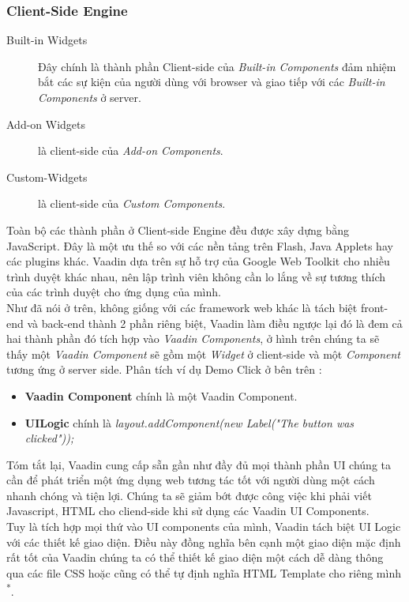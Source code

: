 \subsubsection{Client-Side Engine}
\begin{description}
\item[Built-in Widgets] Đây chính là thành phần Client-side của \textit{Built-in Components} đảm nhiệm bắt các sự kiện của người dùng với browser và giao tiếp với các \textit{Built-in Components} ở server.
\item[Add-on Widgets] là client-side của \textit{Add-on Components}.
\item[Custom-Widgets] là client-side của \textit{Custom Components}.
\end{description}
Toàn bộ các thành phần ở Client-side Engine đều được xây dựng bằng JavaScript. Đây là một ưu thế so với các nền tảng trên Flash, Java Applets hay các plugins khác. Vaadin dựa trên sự hỗ trợ của Google Web Toolkit cho nhiều trình duyệt khác nhau, nên lập trình viên không cần lo lắng về sự tương thích của các trình duyệt cho ứng dụng của mình.
\\
Như đã nói ở trên, không giống với các framework web khác là tách biệt front-end và back-end thành 2 phần riêng biệt, Vaadin làm điều ngược lại đó là đem cả hai thành phần đó tích hợp vào \textit{Vaadin Components}, ở hình trên chúng ta sẽ thấy một \textit{Vaadin Component} sẽ gồm một \textit{Widget} ở client-side  và một \textit{Component} tương ứng ở server side. Phân tích ví dụ Demo Click ở bên trên :
\begin{itemize}
\item \textbf{Vaadin Component} chính là một Vaadin Component.
\item \textbf{UILogic} chính là \textit{layout.addComponent(new Label("The button was clicked"));}
\end{itemize}

Tóm tắt lại, Vaadin cung cấp sẵn gần như đầy đủ mọi thành phần UI chúng ta cần để phát triển một ứng dụng web tương tác tốt với người dùng một cách nhanh chóng và tiện lợi. Chúng ta sẽ giảm bớt được công việc khi phải viết Javascript, HTML cho cliend-side khi sử dụng các Vaadin UI Components.
\\
Tuy là tích hợp mọi thứ vào UI components của mình, Vaadin tách biệt UI Logic với các thiết kế giao diện. Điều này đồng nghĩa bên cạnh một giao diện mặc định rất tốt của Vaadin chúng ta có thể thiết kế giao diện một cách dễ dàng thông qua các file CSS hoặc cũng có thể tự định nghĩa HTML Template cho riêng mình \textsuperscript{*}. 
{\let\thefootnote\relax{}
}
